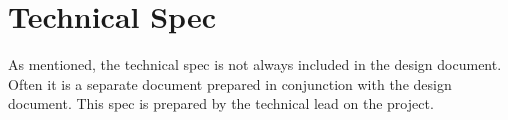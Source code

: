 \chapter{Technical Spec}
As mentioned, the technical spec is not always included in the design document. Often it is a separate document prepared in conjunction with the design document. This spec is prepared by the technical lead on the project.











